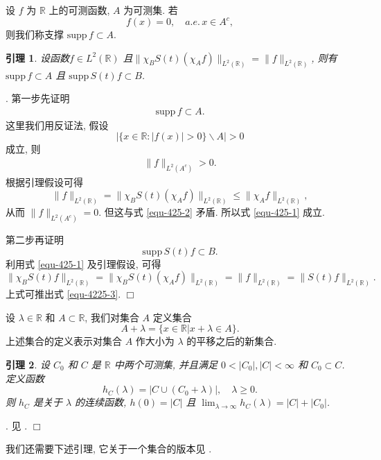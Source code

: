 \documentclass[master]{cugthesis}
\newcommand\R{\ensuremath{\mathbb{R}}}
\newenvironment{proof}{{\noindent\itshape 证明}.}{\hfill $\Box$\par}
\newtheorem{lemma}{引理}[chapter]
\begin{document}
设 $f$ 为 $\R$ 上的可测函数, $A$ 为可测集. 若
$$
f(x)=0, \quad a.e. \, x\in A^c,
$$
则我们称支撑 $\mathrm{supp } \, f\subset A$. 

\begin{lemma}\label{lem-2}
设函数$f\in L^2(\R)$ 且$\|\chi_BS(t)(\chi_Af)\|_{L^2(\R)}=\|f\|_{L^2(\R)}$,  则有 $\mathrm{supp } \, f\subset A$
且 $\mathrm{supp } \, S(t)f \subset B$.
\end{lemma}
\begin{proof}
第一步先证明
\begin{align}\label{equ-425-1}
\mathrm{supp }  \, f\subset A.
\end{align}
这里我们用反证法, 假设
$$
\Big|\{x\in \R: |f(x)|>0\} \backslash A \Big|>0
$$
成立, 则
\begin{align}\label{equ-425-2}
\|f\|_{L^2(A^c)}>0.
\end{align}
根据引理假设可得
$$
\|f\|_{L^2(\R)}=\|\chi_BS(t)(\chi_Af)\|_{L^2(\R)}\leq \|\chi_Af\|_{L^2(\R)},
$$
从而 $\|f\|_{L^2(A^c)}=0$. 但这与式 \eqref{equ-425-2} 矛盾. 所以式 \eqref{equ-425-1} 成立.

第二步再证明
\begin{equation}\label{equ-4225-3}
    \mathrm{supp}\, S(t)f\subset B.
\end{equation}
利用式 \eqref{equ-425-1} 及引理假设, 可得
$$
\|\chi_BS(t)f\|_{L^2(\R)}=\|\chi_BS(t)(\chi_Af)\|_{L^2(\R)}=\|f\|_{L^2(\R)}=\|S(t)f\|_{L^2(\R)}.
$$
上式可推出式 \eqref{equ-4225-3}.
\end{proof}

设 $\lambda\in \R$ 和 $A\subset\mathbb{R}$, 我们对集合 $A$ 定义集合
$$A+\lambda=\{x\in \mathbb{R}\lvert x+\lambda \in A\}.$$
上述集合的定义表示对集合 $A$ 作大小为 $\lambda$ 的平移之后的新集合.
\begin{lemma}\label{lem-3}
设 $C_0$ 和 $C$ 是 $\R$ 中两个可测集, 并且满足 $0<|C_0|,|C|<\infty$ 和 $C_0\subset C$. 定义函数
$$
h_C(\lambda)=|C\cup (C_0+\lambda)|, \quad \lambda\geq 0.
$$
则 $h_C$ 是关于 $\lambda$ 的连续函数, $h(0)=|C|$ 且  $\lim_{\lambda\to \infty}\limits h_C(\lambda)=|C|+|C_0|$.
\end{lemma}
\begin{proof}
见 \cite[p.~99]{Havin2012}.
\end{proof}

我们还需要下述引理, 它关于一个集合的版本见 \cite[定理 1]{Amrein1977OnSP}.
\end{document}

